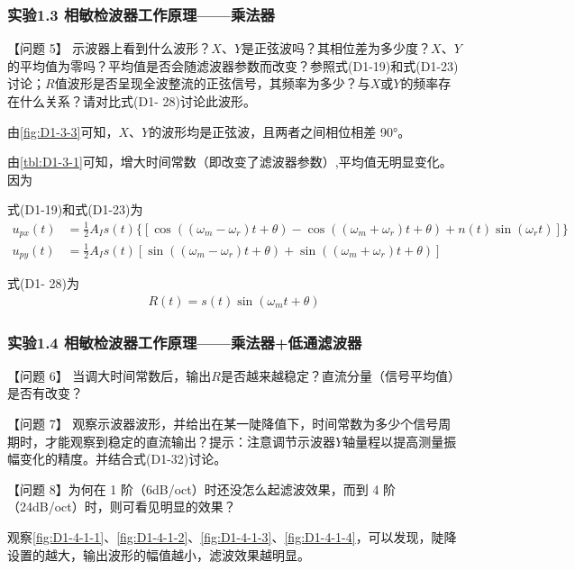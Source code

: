 \documentclass[dvipsnames, svgnames,a4paper,11pt]{article}
\begin{document}
	\subsubsection*{实验1.3 \quad 相敏检波器工作原理——乘法器}

		【问题 5】 示波器上看到什么波形？$X$、$Y$是正弦波吗？其相位差为多少度？$X$、$Y$的平均值为零吗？平均值是否会随滤波器参数而改变？参照式(D1-19)和式(D1-23)讨论；$R$值波形是否呈现全波整流的正弦信号，其频率为多少？与$X$或$Y$的频率存在什么关系？请对比式(D1- 28)讨论此波形。

		由\cref{fig:D1-3-3}可知，$X$、$Y$的波形均是正弦波，且两者之间相位相差 90°。

		由\cref{tbl:D1-3-1}可知，增大时间常数（即改变了滤波器参数）,平均值无明显变化。因为



		式(D1-19)和式(D1-23)为
		\begin{align*}
			u_{px}(t) &= \frac{1}{2} A_I s(t) \{ [ \cos((\omega_m - \omega_r)t + \theta) - \cos((\omega_m + \omega_r)t + \theta) + n(t)\sin(\omega_r t) ]\} \\
			u_{py}(t) &= \frac{1}{2} A_I s(t) [ \sin((\omega_m - \omega_r)t + \theta) + \sin((\omega_m + \omega_r)t + \theta) ]
		\end{align*}

		式(D1- 28)为
		\begin{align*}
			R(t) = s(t) \sin(\omega_m t + \theta)
		\end{align*}





		
	\subsubsection*{实验1.4 \quad 相敏检波器工作原理——乘法器+低通滤波器}

		【问题 6】 当调大时间常数后，输出$R$是否越来越稳定？直流分量（信号平均值）是否有改变？



		【问题 7】 观察示波器波形，并给出在某一陡降值下，时间常数为多少个信号周期时，才能观察到稳定的直流输出？提示：注意调节示波器$Y$轴量程以提高测量振幅变化的精度。并结合式(D1-32)讨论。



		【问题 8】为何在 1 阶（6dB/oct）时还没怎么起滤波效果，而到 4 阶（24dB/oct）时，则可看见明显的效果？

		观察\cref{fig:D1-4-1-1}、\cref{fig:D1-4-1-2}、\cref{fig:D1-4-1-3}、\cref{fig:D1-4-1-4}，可以发现，陡降设置的越大，输出波形的幅值越小，滤波效果越明显。
\end{document}
